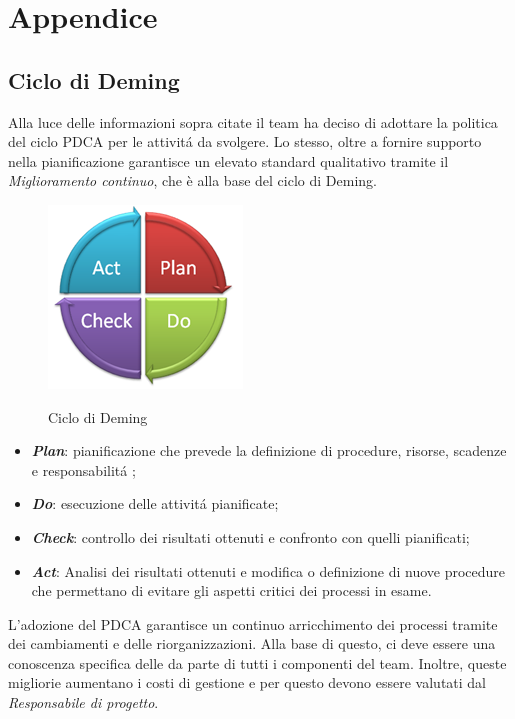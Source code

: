 \section{Appendice}
\subsection{Ciclo di Deming}
Alla luce delle informazioni sopra citate il team ha deciso di adottare la politica del ciclo PDCA per le attivit\'a da svolgere. Lo stesso, oltre a fornire supporto nella pianificazione garantisce un elevato standard qualitativo tramite il \textit{Miglioramento continuo}, che è alla base del ciclo di Deming.
\begin{figure}[H]
\centering
     \includegraphics[scale=1]{../modello/img/pdca}\\
     \caption{Ciclo di Deming}\label{fig:1}
\end{figure}
\begin{itemize}
\item \textbf{\textit{Plan}}: pianificazione che prevede la definizione di procedure, risorse, scadenze e responsabilit\'a ;
\item \textbf{\textit{Do}}: esecuzione delle attivit\'a pianificate; 
\item \textbf{\textit{Check}}: controllo dei risultati ottenuti e confronto con quelli pianificati;
\item \textbf{\textit{Act}}: Analisi dei risultati ottenuti e modifica o definizione di nuove procedure che permettano di evitare gli aspetti critici dei processi in esame.
\end{itemize}
L'adozione del PDCA garantisce un continuo arricchimento dei processi tramite dei cambiamenti e delle riorganizzazioni. Alla base di questo, ci deve essere una conoscenza specifica delle \infoNDP{} da parte di tutti i componenti del team. Inoltre, queste migliorie aumentano i costi di gestione e per questo devono essere valutati dal \textit{Responsabile di progetto}.
